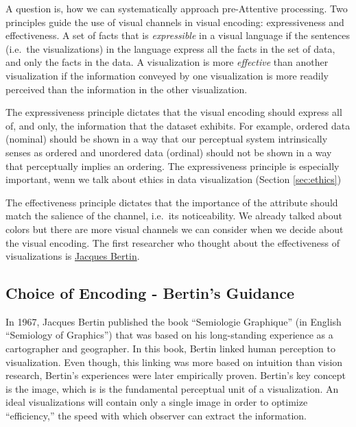 \documentclass[
]{book}
\begin{document}
A question is, how we can systematically approach pre-Attentive processing. Two principles guide the use of visual channels in visual encoding: expressiveness and effectiveness. A set of facts that is \emph{expressible} in a visual language if the sentences (i.e.~the visualizations) in the language express all the facts in the set of data, and only the facts in the data. A visualization is more \emph{effective} than another visualization if the information conveyed by one visualization is more readily perceived than the information in the other visualization.

The expressiveness principle dictates that the visual encoding should express all of, and only, the information that the dataset exhibits. For example, ordered data (nominal) should be shown in a way that our perceptual system intrinsically senses as ordered and unordered data (ordinal) should not be shown in a way that perceptually implies an ordering. The expressiveness principle is especially important, wenn we talk about ethics in data visualization (Section \ref{sec:ethics})

The effectiveness principle dictates that the importance of the attribute should match the salience of the channel, i.e.~its noticeability. We already talked about colors but there are more visual channels we can consider when we decide about the visual encoding. The first researcher who thought about the effectiveness of visualizations is \href{https://en.wikipedia.org/wiki/Jacques_Bertin}{Jacques Bertin}.

\hypertarget{choice-of-encoding---bertins-guidance}{%
\subsection{Choice of Encoding - Bertin's Guidance}\label{choice-of-encoding---bertins-guidance}}

In 1967, Jacques Bertin published the book ``Semiologie Graphique'' (in English ``Semiology of Graphics'') that was based on his long-standing experience as a cartographer and geographer. In this book, Bertin linked human perception to visualization. Even though, this linking was more based on intuition than vision research, Bertin's experiences were later empirically proven. Bertin's key concept is the image, which is is the fundamental perceptual unit of a visualization. An ideal visualizations will contain only a single image in order to optimize ``efficiency,'' the speed with which observer can extract the information.
\end{document}
